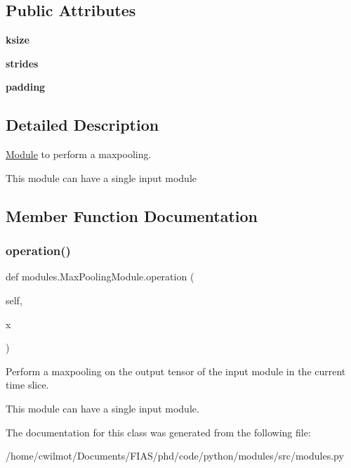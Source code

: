 \subsection*{Public Attributes}
\begin{DoxyCompactItemize}
\item 
\mbox{\label{classmodules_1_1_max_pooling_module_ae007bccfd76c9083d1021643c4969fd4}} 
{\bfseries ksize}
\item 
\mbox{\label{classmodules_1_1_max_pooling_module_a234b76388be765dbd5604463e160aca6}} 
{\bfseries strides}
\item 
\mbox{\label{classmodules_1_1_max_pooling_module_a719909f20180c9e63249afbe83c409a7}} 
{\bfseries padding}
\end{DoxyCompactItemize}


\subsection{Detailed Description}
\hyperlink{classmodules_1_1_module}{Module} to perform a maxpooling. 

This module can have a single input module 

\subsection{Member Function Documentation}
\mbox{\label{classmodules_1_1_max_pooling_module_a833701a5c7f28279a21984069d3faa11}} 
\subsubsection{\texorpdfstring{operation()}{operation()}}
{\footnotesize\ttfamily def modules.\+Max\+Pooling\+Module.\+operation (\begin{DoxyParamCaption}\item[{}]{self,  }\item[{}]{x }\end{DoxyParamCaption})}



Perform a maxpooling on the output tensor of the input module in the current time slice. 

This module can have a single input module. 

The documentation for this class was generated from the following file\+:\begin{DoxyCompactItemize}
\item 
/home/cwilmot/\+Documents/\+F\+I\+A\+S/phd/code/python/modules/src/modules.\+py\end{DoxyCompactItemize}
